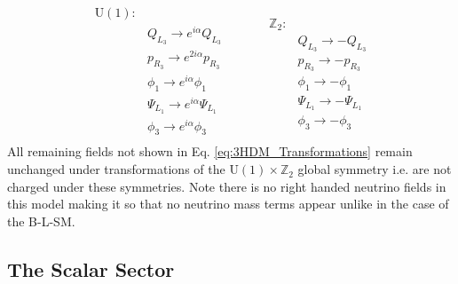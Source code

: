 \begin{equation}
\label{eq:3HDM_Transformations}
	\begin{split} 
	\mathrm{U(1)} : & \\
		& Q_{L_3} \rightarrow    e^{i \alpha} Q_{L_3}  \\  
		& p_{R_3} \rightarrow    e^{2 i \alpha} p_{R_3}  \\
		& \phi_1  \rightarrow    e^{i \alpha} \phi_1  \\   
		& \Psi_{L_1} \rightarrow e^{i \alpha} \Psi_{L_1} \\
		& \phi_3 \rightarrow     e^{i \alpha} \phi_3  \\ 
	\end{split} \quad \quad \quad  
	\begin{split}
		\mathbb{Z}_2 : & \\
		 	& Q_{L_3} \rightarrow -Q_{L_3} \\
		 	& p_{R_3} \rightarrow -p_{R_3} \\ 
		 	& \phi_1  \rightarrow -\phi_1 \\ 
		 	& \Psi_{L_1} \rightarrow - \Psi_{L_1} \\ 
		 	& \phi_3 \rightarrow -\phi_3
	\end{split}  
\end{equation} 
%
All remaining fields not shown in Eq. \ref{eq:3HDM_Transformations} remain unchanged under transformations of the $\mathrm{U(1)}\times\mathbb{Z}_2$ global symmetry i.e. are not charged under these symmetries.  
%
Note there is no right handed neutrino fields in this model making it so that no neutrino mass terms appear unlike in the case of the B-L-SM.

\subsection{The Scalar Sector}

